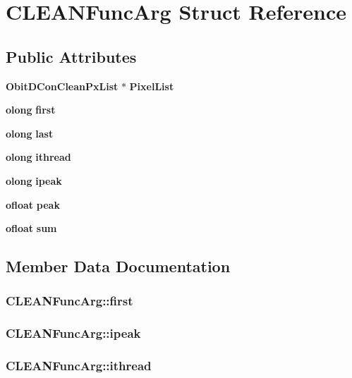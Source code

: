 \section{CLEANFunc\-Arg Struct Reference}
\label{structCLEANFuncArg}
\subsection*{Public Attributes}
\begin{CompactItemize}
\item 
{\bf Obit\-DCon\-Clean\-Px\-List} $\ast$ {\bf Pixel\-List}
\item 
{\bf olong} {\bf first}
\item 
{\bf olong} {\bf last}
\item 
{\bf olong} {\bf ithread}
\item 
{\bf olong} {\bf ipeak}
\item 
{\bf ofloat} {\bf peak}
\item 
{\bf ofloat} {\bf sum}
\end{CompactItemize}


\subsection{Member Data Documentation}
\subsubsection{ {\bf CLEANFunc\-Arg::first}}\label{structCLEANFuncArg_o1}


\subsubsection{ {\bf CLEANFunc\-Arg::ipeak}}\label{structCLEANFuncArg_o4}


\subsubsection{ {\bf CLEANFunc\-Arg::ithread}}\label{structCLEANFuncArg_o3}


